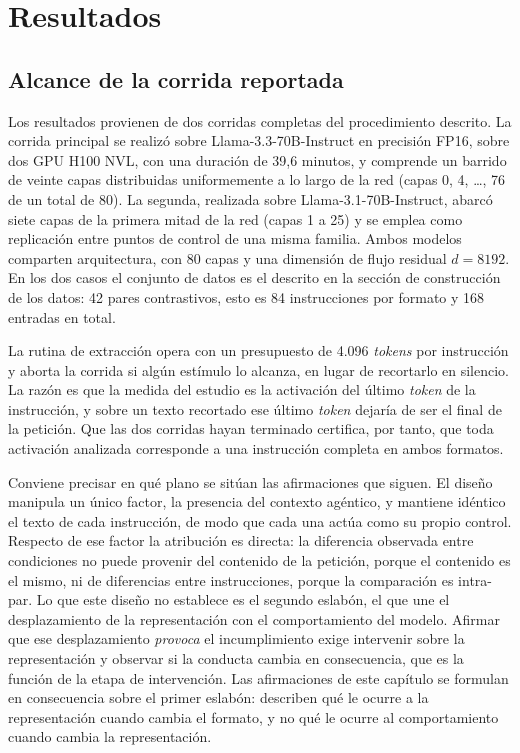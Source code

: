 \documentclass[12pt,a4paper]{article}
\begin{document}
\section{Resultados}

\subsection{Alcance de la corrida reportada}

\justifying

Los resultados provienen de dos corridas completas del procedimiento descrito. La corrida principal se realizó sobre Llama-3.3-70B-Instruct en precisión FP16, sobre dos GPU H100 NVL, con una duración de 39{,}6 minutos, y comprende un barrido de veinte capas distribuidas uniformemente a lo largo de la red (capas 0, 4, \ldots, 76 de un total de 80). La segunda, realizada sobre Llama-3.1-70B-Instruct, abarcó siete capas de la primera mitad de la red (capas 1 a 25) y se emplea como replicación entre puntos de control de una misma familia. Ambos modelos comparten arquitectura, con 80 capas y una dimensión de flujo residual $d = 8192$. En los dos casos el conjunto de datos es el descrito en la sección de construcción de los datos: 42 pares contrastivos, esto es 84 instrucciones por formato y 168 entradas en total.

La rutina de extracción opera con un presupuesto de 4.096 \textit{tokens} por instrucción y aborta la corrida si algún estímulo lo alcanza, en lugar de recortarlo en silencio. La razón es que la medida del estudio es la activación del último \textit{token} de la instrucción, y sobre un texto recortado ese último \textit{token} dejaría de ser el final de la petición. Que las dos corridas hayan terminado certifica, por tanto, que toda activación analizada corresponde a una instrucción completa en ambos formatos.

Conviene precisar en qué plano se sitúan las afirmaciones que siguen. El diseño manipula un único factor, la presencia del contexto agéntico, y mantiene idéntico el texto de cada instrucción, de modo que cada una actúa como su propio control. Respecto de ese factor la atribución es directa: la diferencia observada entre condiciones no puede provenir del contenido de la petición, porque el contenido es el mismo, ni de diferencias entre instrucciones, porque la comparación es intra-par. Lo que este diseño no establece es el segundo eslabón, el que une el desplazamiento de la representación con el comportamiento del modelo. Afirmar que ese desplazamiento \emph{provoca} el incumplimiento exige intervenir sobre la representación y observar si la conducta cambia en consecuencia, que es la función de la etapa de intervención. Las afirmaciones de este capítulo se formulan en consecuencia sobre el primer eslabón: describen qué le ocurre a la representación cuando cambia el formato, y no qué le ocurre al comportamiento cuando cambia la representación.
\end{document}
